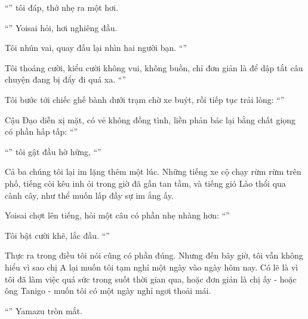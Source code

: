 \documentclass[../main.tex]{subfiles}
\begin{document}
``'' tôi đáp, thở nhẹ ra một hơi.

``'' Yoisai hỏi, hơi nghiêng đầu.

Tôi nhún vai, quay đầu lại nhìn hai người bạn. ``''

Tôi thoáng cười, kiểu cười không vui, không buồn, chỉ đơn giản là để dập tắt câu chuyện đang bị đẩy đi quá xa. ``''

Tôi bước tới chiếc ghế bành dưới trạm chờ xe buýt, rồi tiếp tục trải lòng: ``''

Cậu Đạo diễn xị mặt, có vẻ không đồng tình, liền phản bác lại bằng chất giọng có phần hấp tấp: ``''

``'' tôi gật đầu hờ hững, ``''

Cả ba chúng tôi lại im lặng thêm một lúc. Những tiếng xe cộ chạy rừm rừm trên phố, tiếng còi kêu inh ỏi trong giờ đã gần tan tầm, và tiếng gió Lào thổi qua cành cây, như thể muốn lấp đầy sự im ắng ấy.

Yoisai chợt lên tiếng, hỏi một câu có phần nhẹ nhàng hơn: ``''

Tôi bật cười khẽ, lắc đầu. ``''

Thực ra trong điều tôi nói cũng có phần đúng. Nhưng đến bây giờ, tôi vẫn không hiểu vì sao chị A lại muốn tôi tạm nghỉ một ngày vào ngày hôm nay. Có lẽ là vì tôi đã làm việc quá sức trong suốt thời gian qua, hoặc đơn giản là chị ấy - hoặc ông Tanigo - muốn tôi có một ngày nghỉ ngơi thoải mái.

``'' Yamazu tròn mắt.
\end{document}
